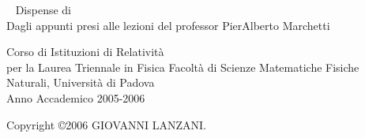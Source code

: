 \begin{titlepage}
\begin{center}
\mbox{} \vskip 2cm
\ \Huge \hskip 0.5cm Dispense di \\
\vskip 2cm
\normalsize Dagli appunti presi alle lezioni del professor PierAlberto Marchetti\\
\vskip 3cm

 Corso di Istituzioni di Relativit\`a \\
\hskip 1.78cm per la Laurea Triennale in Fisica \newline
Facolt\`a di Scienze Matematiche Fisiche Naturali, Universit\`a di Padova \\
Anno Accademico 2005-2006\\
\vspace{1cm}


\end{center}
\end{titlepage}


Copyright \copyright  2006 GIOVANNI LANZANI.
\doclicenseThis
